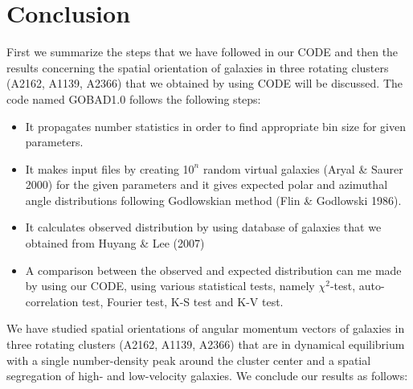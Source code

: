 \chapter{Conclusion}

First we summarize the steps that we have followed in our CODE and 
then the results concerning the spatial orientation of galaxies in three
rotating clusters (A2162, A1139, A2366) that we obtained by using CODE will be discussed.
The code named GOBAD1.0 follows the following steps:
\begin{itemize}
\item It propagates number statistics in order to find appropriate bin size for given parameters. 
\item It makes input files by creating 1$0^n$ random virtual galaxies (Aryal \& Saurer 2000) for the given parameters and it gives expected polar and azimuthal angle distributions following Godlowskian method (Flin \& Godlowski 1986).
\item It calculates observed distribution by using database of galaxies that we obtained from Huyang \& Lee (2007)
\item A comparison between the observed and expected distribution can me made by using our CODE, using various statistical tests, namely $\chi^2$-test, auto-correlation test, Fourier test, K-S test and K-V test. 
\end{itemize}
We have studied spatial orientations of angular momentum vectors
of galaxies in three rotating clusters (A2162, A1139, A2366) that are in dynamical
equilibrium with a single number-density peak around the cluster
center and a spatial segregation of high- and low-velocity
galaxies. We conclude our results as follows:

